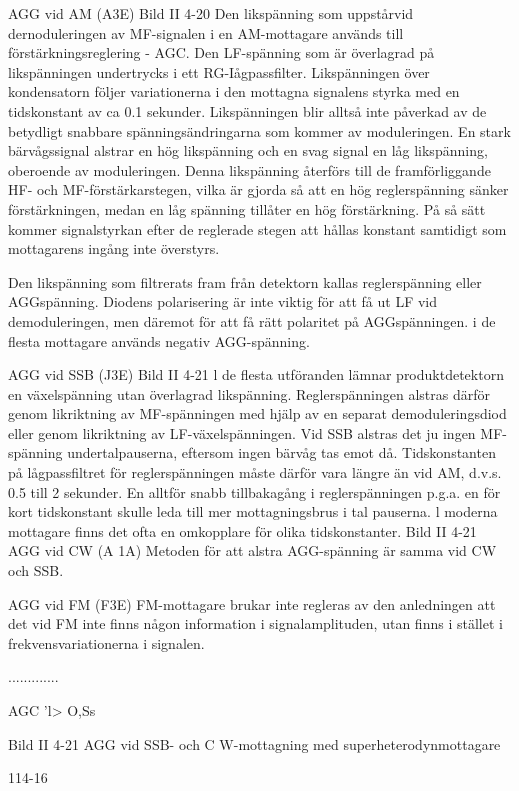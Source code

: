 \documentclass[a4paper,twoside,twocolumn,openright]{book}
\begin{document}
{{{AGG vid AM (A3E)
Bild II 4-20
Den likspänning som uppstårvid dernoduleringen av MF-signalen i en AM-mottagare
används till förstärkningsreglering - AGC.
Den LF-spänning som är överlagrad på
likspänningen undertrycks i ett RG-Iågpassfilter. Likspänningen över kondensatorn följer variationerna i den mottagna signalens
styrka med en tidskonstant av ca 0.1 sekunder. Likspänningen blir alltså inte påverkad
av de betydligt snabbare spänningsändringarna som kommer av moduleringen.
En stark bärvågssignal alstrar en hög
likspänning och en svag signal en låg likspänning, oberoende av moduleringen.
Denna likspänning återförs till de framförliggande HF- och MF-förstärkarstegen, vilka
är gjorda så att en hög reglerspänning sänker förstärkningen, medan en låg spänning
tillåter en hög förstärkning.
På så sätt kommer signalstyrkan efter de
reglerade stegen att hållas konstant samtidigt som mottagarens ingång inte överstyrs.

Den likspänning som filtrerats fram från
detektorn kallas reglerspänning eller AGGspänning. Diodens polarisering är inte viktig
för att få ut LF vid demoduleringen, men
däremot för att få rätt polaritet på AGGspänningen. i de flesta mottagare används
negativ AGG-spänning.

AGG vid SSB (J3E)
Bild II 4-21
l de flesta utföranden lämnar produktdetektorn en växelspänning utan överlagrad likspänning. Reglerspänningen alstras därför
genom likriktning av MF-spänningen med
hjälp av en separat demoduleringsdiod eller
genom likriktning av LF-växelspänningen.
Vid SSB alstras det ju ingen MF-spänning undertalpauserna, eftersom ingen bärvåg tas emot då. Tidskonstanten på lågpassfiltret för reglerspänningen måste därför vara längre än vid AM, d.v.s. 0.5 till 2
sekunder. En alltför snabb tillbakagång i
reglerspänningen p.g.a. en för kort tidskonstant skulle leda till mer mottagningsbrus i
tal pauserna. l moderna mottagare finns det
ofta en omkopplare för olika tidskonstanter.
Bild II 4-21
AGG vid CW (A 1A)
Metoden för att alstra AGG-spänning är
samma vid CW och SSB.

AGG vid FM (F3E)
FM-mottagare brukar inte regleras av den
anledningen att det vid FM inte finns någon
information i signalamplituden, utan finns i
stället i frekvensvariationerna i signalen.

.............

AGC
'l> O,Ss

Bild II 4-21 AGG vid SSB- och C W-mottagning med superheterodynmottagare

114-16

}}}
\end{document}
